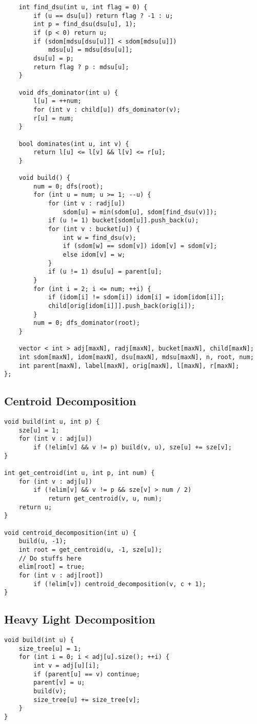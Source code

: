 \documentclass[10pt,landscape]{article}
\begin{document}
\begin{multicols}{2}
\begin{lstlisting}
    int find_dsu(int u, int flag = 0) {
        if (u == dsu[u]) return flag ? -1 : u;
        int p = find_dsu(dsu[u], 1);
        if (p < 0) return u;
        if (sdom[mdsu[dsu[u]]] < sdom[mdsu[u]])
            mdsu[u] = mdsu[dsu[u]];
        dsu[u] = p;
        return flag ? p : mdsu[u];
    }

    void dfs_dominator(int u) {
        l[u] = ++num;
        for (int v : child[u]) dfs_dominator(v);
        r[u] = num;
    }

    bool dominates(int u, int v) {
        return l[u] <= l[v] && l[v] <= r[u];
    }
    
    void build() {
        num = 0; dfs(root);
        for (int u = num; u >= 1; --u) {
            for (int v : radj[u])
                sdom[u] = min(sdom[u], sdom[find_dsu(v)]);
            if (u != 1) bucket[sdom[u]].push_back(u);
            for (int v : bucket[u]) {
                int w = find_dsu(v);
                if (sdom[w] == sdom[v]) idom[v] = sdom[v];
                else idom[v] = w;
            }
            if (u != 1) dsu[u] = parent[u];
        }
        for (int i = 2; i <= num; ++i) {
            if (idom[i] != sdom[i]) idom[i] = idom[idom[i]];
            child[orig[idom[i]]].push_back(orig[i]);
        }
        num = 0; dfs_dominator(root);
    }
    
    vector < int > adj[maxN], radj[maxN], bucket[maxN], child[maxN];
    int sdom[maxN], idom[maxN], dsu[maxN], mdsu[maxN], n, root, num;
    int parent[maxN], label[maxN], orig[maxN], l[maxN], r[maxN];
};
\end{lstlisting}
\subsection{Centroid Decomposition}
\begin{lstlisting}
void build(int u, int p) {
    sze[u] = 1;
    for (int v : adj[u])
        if (!elim[v] && v != p) build(v, u), sze[u] += sze[v];
}

int get_centroid(int u, int p, int num) {
    for (int v : adj[u])
        if (!elim[v] && v != p && sze[v] > num / 2)
            return get_centroid(v, u, num);
    return u;
}

void centroid_decomposition(int u) {
    build(u, -1);
    int root = get_centroid(u, -1, sze[u]);
    // Do stuffs here
    elim[root] = true;
    for (int v : adj[root])
        if (!elim[v]) centroid_decomposition(v, c + 1);
}
\end{lstlisting}
\subsection{Heavy Light Decomposition}
\begin{lstlisting}
void build(int u) {
    size_tree[u] = 1;
    for (int i = 0; i < adj[u].size(); ++i) {
        int v = adj[u][i];
        if (parent[u] == v) continue;
        parent[v] = u;
        build(v);
        size_tree[u] += size_tree[v];
    }
}


\end{lstlisting}
\end{multicols}
\end{document}
